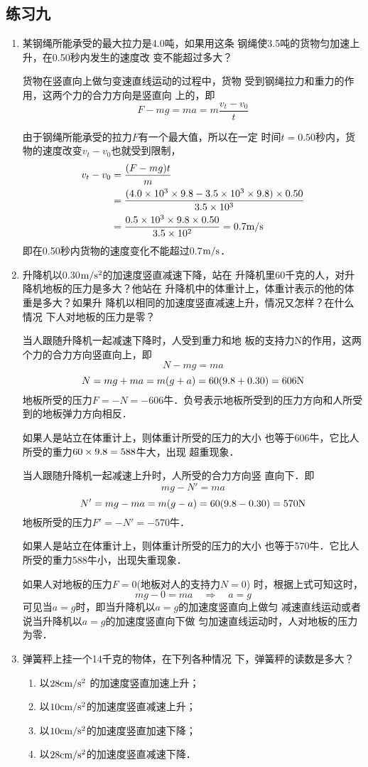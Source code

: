 \subsection{练习九}
\begin{enumerate}
\item 某钢绳所能承受的最大拉力是4.0吨，如果用这条
钢绳使3.5吨的货物匀加速上升，在0.50秒内发生的速度改
变不能超过多大？
	 
\begin{solution}
    货物在竖直向上做匀变速直线运动的过程中，货物
受到钢绳拉力和重力的作用，这两个力的合力方向是竖直向
上的，即
\[F-mg=ma=m\frac{v_t-v_0}{t}\]

由于钢绳所能承受的拉力$F$有一个最大值，所以在一定
时间$t=0.50$秒内，货物的速度改变$v_t-v_0$也就受到限制，
\[\begin{split}
    v_t-v_0&= \frac{(F-mg)t}{m}\\
    &=\frac{(4.0\times10^3\times9.8-3.5\times10^3\times9.8)\times0.50}{3.5\times 10^3}\\
    &=\frac{0.5\times10^3\times9.8\times0.50}{3.5\times10^2}=0.7\text{m}/\text{s}
\end{split}\]
即在0.50秒内货物的速度变化不能超过0.7$\text{m}/\text{s}$．
\end{solution}
\item 升降机以0.30$\text{m}/\text{s}^2$的加速度竖直减速下降，站在
升降机里60千克的人，对升降机地板的压力是多大？他站在
升降机中的体重计上，体重计表示的他的体重是多大？如果升
降机以相同的加速度竖直减速上升，情况又怎样？在什么情况
下人对地板的压力是零？
	 
\begin{solution}
    当人跟随升降机一起减速下降时，人受到重力和地
板的支持力N的作用，这两个力的合力方向竖直向上，即
\[N-mg=ma\]
\[N=mg+ma=m(g+a)=60(9.8+0.30)=606{\rm N}\]
地板所受的压力$F=-N=-606$牛．负号表示地板所受到的压力方向和人所受到的地板弹力方向相反．

如果人是站立在体重计上，则体重计所受的压力的大小
也等于606牛，它比人所受的重力$60\times9.8=588$牛大，出现
超重现象．

当人跟随升降机一起减速上升时，人所受的合力方向竖
直向下．即
\[mg-N'=ma\]
\[N'=mg-ma=m(g-a)=60(9.8-0.30)=570{\rm N}\]
地板所受的压力$F'=-N'=-570$牛．

如果人是站立在体重计上，则体重计所受的压力的大小
也等于570牛．它比人所受的重力588牛小，出现失重现象．

如果人对地板的压力$F=0$(地板对人的支持力$N=0$)
时，根据上式可知这时，
\[mg-0=ma\quad \Rightarrow\quad a=g\]
可见当$a=g$时，即当升降机以$a=g$的加速度竖直向上做匀
减速直线运动或者说当升降机以$a=g$的加速度竖直向下做
匀加速直线运动时，人对地板的压力为零．
\end{solution}
\item 弹簧秤上挂一个14千克的物体，在下列各种情况
下，弹簧秤的读数是多大？
\begin{enumerate}
\item 以$28{\rm cm}/{\rm s^2}$ 的加速度竖直加速上升；
\item 以$10{\rm cm}/{\rm s^2}$的加速度竖直减速上升；
\item 以$10{\rm cm}/{\rm s^2}$的加速度竖直加速下降；
\item 以$28{\rm cm}/{\rm s^2}$的加速度竖直减速下降．
\end{enumerate}
	 

\end{enumerate}
